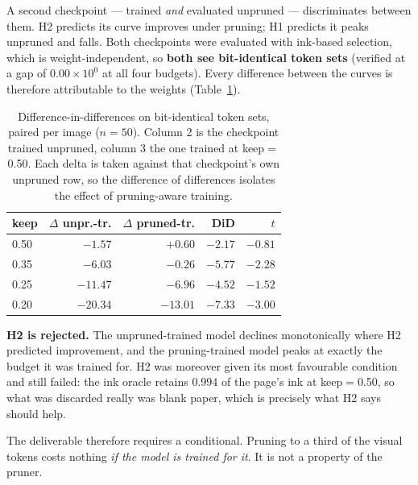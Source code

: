 \documentclass[conference]{IEEEtran}
\begin{document}
A second checkpoint --- trained \emph{and} evaluated unpruned --- discriminates between them.
H2 predicts its curve improves under pruning; H1 predicts it peaks unpruned and falls. Both
checkpoints were evaluated with ink-based selection, which is weight-independent, so
\textbf{both see bit-identical token sets} (verified at a gap of $0.00 \times 10^{0}$ at all
four budgets). Every difference between the curves is therefore attributable to the weights
(Table~\ref{tab:did}).

\begin{table}[htbp]
\caption{Difference-in-differences on bit-identical token sets, paired per image
($n = 50$). Column 2 is the checkpoint trained unpruned, column 3 the one trained at
keep$=$0.50. Each delta is taken against that checkpoint's own unpruned row, so the
difference of differences isolates the effect of pruning-aware training.}
\label{tab:did}
\centering
\begin{tabular}{@{}lrrrr@{}}
\toprule
keep & $\Delta$ unpr.-tr. & $\Delta$ pruned-tr. & DiD & $t$ \\
\midrule
0.50 & $-1.57$  & $+0.60$  & $-2.17$          & $-0.81$ \\
0.35 & $-6.03$  & $-0.26$  & $\bm{-5.77}$     & $\bm{-2.28}$ \\
0.25 & $-11.47$ & $-6.96$  & $-4.52$          & $-1.52$ \\
0.20 & $-20.34$ & $-13.01$ & $\bm{-7.33}$     & $\bm{-3.00}$ \\
\bottomrule
\end{tabular}
\end{table}

\textbf{H2 is rejected.} The unpruned-trained model declines monotonically where H2 predicted
improvement, and the pruning-trained model peaks at exactly the budget it was trained for. H2
was moreover given its most favourable condition and still failed: the ink oracle retains
$0.994$ of the page's ink at keep$=$0.50, so what was discarded really was blank paper, which
is precisely what H2 says should help.

The deliverable therefore requires a conditional. Pruning to a third of the visual tokens
costs nothing \emph{if the model is trained for it}. It is not a property of the pruner.
\end{document}
